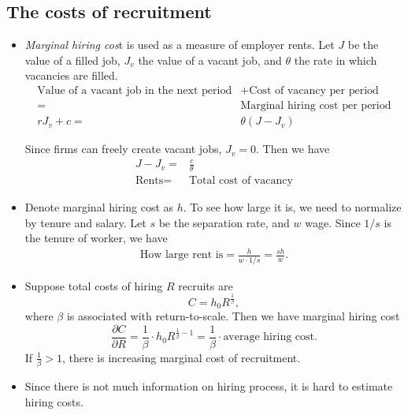 \documentclass[a4paper, 12pt]{article}
\begin{document}
\subsection{The costs of recruitment}
\begin{itemize}
\item \emph{ Marginal hiring cos}t is used as a measure of employer rents. Let $J$ be the value of a filled job, $J_v$ the value of a vacant job, and $\theta$ the rate in which vacancies are filled. 
\begin{align*}
\text{Value of a vacant job in the next period} &+ \text{Cost of vacancy per period} \\
= &\text{Marginal hiring cost per period} \\ 
rJ_v + c=& \theta(J-J_v) 
\end{align*}

Since firms can freely create vacant jobs, $J_v=0$. Then we have
\begin{align*}
J-J_v =& \frac{c}{\theta} \\
\text{Rents} =& \text{Total cost of vacancy} 
\end{align*}
\item Denote marginal hiring cost as $h$. To see how large it is, we need to normalize by tenure and salary. Let $s$ be the separation rate, and $w$ wage. Since $1/s$ is the tenure of worker, we have
\begin{align*}
\text{How large rent is} = \frac{h}{w \cdot 1/s}=\frac{sh}{w}.
\end{align*}
\item Suppose total costs of hiring $R$ recruits are
$$
C = h_0R^{\frac{1}{\beta}},
$$
where $\beta$ is associated with return-to-scale. Then we have marginal hiring cost
$$
\frac{\partial C}{\partial R}= \frac{1}{\beta}\cdot 
{h_0 R^{\frac{1}{\beta}-1}}
=
\frac{1}{\beta} \cdot \text{average hiring cost}.
$$
If $\frac{1}{\beta}>1$, there is increasing marginal cost of recruitment.
\item Since there is not much information on hiring process, it is hard to estimate hiring costs.
\end{itemize}
\end{document}
